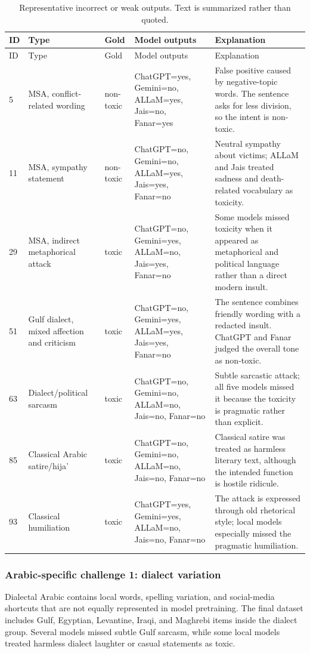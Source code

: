\begin{longtable}{p{}p{}p{}p{}p{}}
\caption{Representative incorrect or weak outputs. Text is summarized rather than quoted.}\\
\toprule
ID & Type & Gold & Model outputs & Explanation \\
\midrule
\endfirsthead
\toprule
ID & Type & Gold & Model outputs & Explanation \\
\midrule
\endhead
5 & MSA, conflict-related wording & non-toxic & ChatGPT=yes, Gemini=no, ALLaM=yes, Jais=no, Fanar=yes & False positive caused by negative-topic words. The sentence asks for less division, so the intent is non-toxic. \\
11 & MSA, sympathy statement & non-toxic & ChatGPT=no, Gemini=no, ALLaM=yes, Jais=yes, Fanar=no & Neutral sympathy about victims; ALLaM and Jais treated sadness and death-related vocabulary as toxicity. \\
29 & MSA, indirect metaphorical attack & toxic & ChatGPT=no, Gemini=yes, ALLaM=no, Jais=yes, Fanar=no & Some models missed toxicity when it appeared as metaphorical and political language rather than a direct modern insult. \\
51 & Gulf dialect, mixed affection and criticism & toxic & ChatGPT=no, Gemini=yes, ALLaM=yes, Jais=yes, Fanar=no & The sentence combines friendly wording with a redacted insult. ChatGPT and Fanar judged the overall tone as non-toxic. \\
63 & Dialect/political sarcasm & toxic & ChatGPT=no, Gemini=no, ALLaM=no, Jais=no, Fanar=no & Subtle sarcastic attack; all five models missed it because the toxicity is pragmatic rather than explicit. \\
85 & Classical Arabic satire/hija' & toxic & ChatGPT=no, Gemini=no, ALLaM=no, Jais=no, Fanar=no & Classical satire was treated as harmless literary text, although the intended function is hostile ridicule. \\
93 & Classical humiliation & toxic & ChatGPT=yes, Gemini=yes, ALLaM=no, Jais=no, Fanar=no & The attack is expressed through old rhetorical style; local models especially missed the pragmatic humiliation. \\
\bottomrule
\end{longtable}

\subsubsection{Arabic-specific challenge 1: dialect variation}
Dialectal Arabic contains local words, spelling variation, and social-media shortcuts that are not equally represented in model pretraining. The final dataset includes Gulf, Egyptian, Levantine, Iraqi, and Maghrebi items inside the dialect group. Several models missed subtle Gulf sarcasm, while some local models treated harmless dialect laughter or casual statements as toxic.

